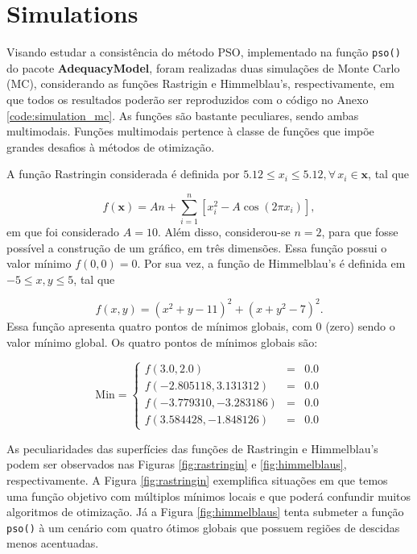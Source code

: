 \documentclass[10pt,letterpaper]{article}
\begin{document}
\section{Simulations}
Visando estudar a consistência do método PSO, implementado na função \texttt{pso()} do pacote \textbf{AdequacyModel}, foram realizadas duas simulações de Monte Carlo (MC), considerando as funções Rastrigin e Himmelblau's, respectivamente, em que todos os resultados poderão ser reproduzidos com o código no Anexo \ref{code:simulation_mc}. As funções são bastante peculiares, sendo ambas multimodais. Funções multimodais pertence à classe de funções que impõe grandes desafios à métodos de otimização.

A função Rastringin considerada é definida por $5.12 \leq x_i \leq 5.12, \forall\, x_i \in \bm{x}$, tal que

\begin{equation}
f(\bm{x}) = An + \sum_{i = 1}^{n} [x_i^2 - A\cos(2\pi x_i) ],
\label{eq:rastringin}
\end{equation}
em que foi considerado $A = 10$. Além disso, considerou-se $n = 2$, para que fosse possível a construção de um gráfico, em três dimensões. Essa função possui o valor mínimo $f(0, 0) = 0$. Por sua vez, a função de  Himmelblau's é definida em $-5 \leq x,y \leq 5$, tal que

\begin{equation}
f(x, y) = (x^2 + y -11)^2 + (x + y^2 - 7)^2.
\label{eq:himmelblaus}
\end{equation}
Essa função apresenta quatro pontos de mínimos globais, com 0 (zero) sendo o valor mínimo global. Os quatro pontos de mínimos globais são:

$$
\mathrm{Min} = \left \{
\begin{array}{rcc}
f(3.0, 2.0) & = & 0.0 \\
f(-2.805118, 3.131312) & = & 0.0 \\
f(-3.779310, -3.283186) & = & 0.0 \\
f(3.584428, -1.848126) & = & 0.0
\end{array} 
\right.
$$

As peculiaridades das superfícies das funções de Rastringin e Himmelblau's podem ser observados nas Figuras \ref{fig:rastringin} e \ref{fig:himmelblaus}, respectivamente. A Figura \ref{fig:rastringin} exemplifica situações em que temos uma função objetivo com múltiplos mínimos locais e que poderá confundir muitos algoritmos de otimização. Já a Figura \ref{fig:himmelblaus} tenta submeter a função \texttt{pso()} à um cenário com quatro ótimos globais que possuem regiões de descidas menos acentuadas.
\end{document}
